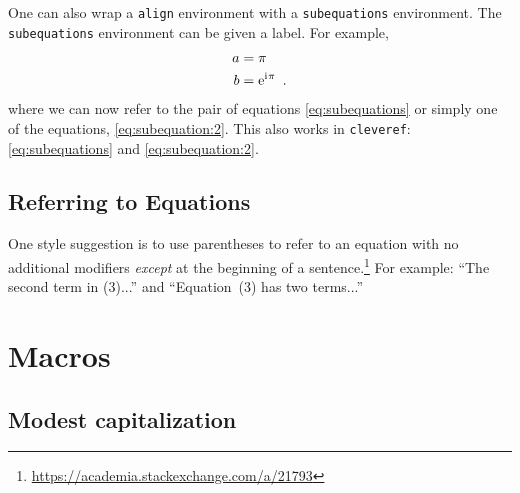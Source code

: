 One can also wrap a \texttt{align} environment with a \texttt{subequations} environment. The \texttt{subequations} environment can be given a label. For example,
\begin{subequations}\label{eq:subequations}
\begin{align}
	a &= \pi 
	\label{eq:subequation:1}
	\\
	b &= \operatorname{e}^{\operatorname{i}\mkern-2mu \pi} 
	\ .
	\label{eq:subequation:2}
\end{align}
\end{subequations}
where we can now refer to the pair of equations \eqref{eq:subequations} or simply one of the equations, \eqref{eq:subequation:2}. This also works in \texttt{cleveref}: \cref{eq:subequations} and \cref{eq:subequation:2}.


\subsection{Referring to Equations}

One style suggestion is to use parentheses to refer to an equation with no additional modifiers \emph{except} at the beginning of a sentence.\footnote{\url{https://academia.stackexchange.com/a/21793}} For example: ``The second term in (3)...'' and ``Equation~(3) has two terms...''



\section{Macros}
\label{sec:macros}


\subsection{Modest capitalization}

